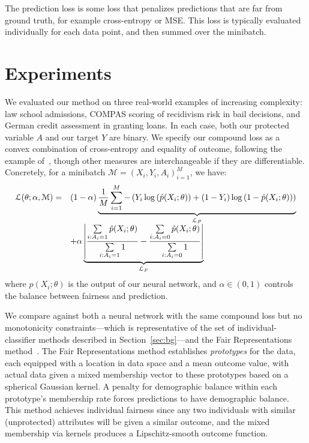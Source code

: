     The prediction loss is some loss that penalizes predictions that are far from ground truth, for example cross-entropy or MSE. This loss is typically evaluated individually for each data point, and then summed over the minibatch.

\section{Experiments}
    \label{sec:monofair_experiments}
    
    We evaluated our method on three real-world examples of increasing complexity: law school admissions, COMPAS scoring of recidivism risk in bail decisions, and German credit assessment in granting loans.  In each case, both our protected variable $A$ and our target $Y$ are binary. We specify our compound loss as a convex combination of cross-entropy and equality of outcome, following the example of~\cite{ZemQiSwePitDwo2013}, though other measures are interchangeable if they are differentiable. Concretely, for a minibatch  $\mathcal{M} = (X_i, Y_i, A_i)_{i=1}^M$, we have:
    \begin{equation}
        \begin{array}{l l}
            \mathcal{L}(\theta;\alpha, \mathcal{M}) =
            & (1 - \alpha) \underbrace{\frac{1}{M}
                \sum_{i=1}^M -\left(Y_i \log\left(\hat{p}(X_i; \theta)\right) + (1 - Y_i) \log\left(1 - \hat{p}(X_i; \theta) \right)\right)
            }_{\mathcal{L}_P} \\  
            & + \alpha \underbrace{
                    \left| 
                        \frac{\sum\limits_{i: A_i = 1} \hat{p}(X_i; \theta)}{\sum\limits_{i: A_i = 1} 1}
                        -
                        \frac{\sum\limits_{i: A_i = 0} \hat{p}(X_i; \theta)}{\sum\limits_{i: A_i = 0} 1}
                    \right|
            }_{\mathcal{L}_F} \nonumber
        \end{array} \label{eqn:experiment_loss}
    \end{equation}
    where $\hat{p}(X_i; \theta)$ is the output of our neural network, and $\alpha\in (0,1)$ controls the balance between fairness and prediction.
    
    We compare against both a neural network with the same compound loss but no monotonicity constraints---which is representative of the set of individual-classifier methods described in Section~\ref{sec:bg}---and the Fair Representations method~\cite{ZemQiSwePitDwo2013}. The Fair Representations method establishes \textit{prototypes} for the data, each equipped with a location in data space and a mean outcome value, with actual data given a mixed membership vector to these prototypes based on a spherical Gaussian kernel. A penalty for demographic balance within each prototype's membership rate forces predictions to have demographic balance. This method achieves individual fairness since any two individuals with similar (unprotected) attributes will be given a similar outcome, and the mixed membership via kernels produces a Lipschitz-smooth outcome function.

